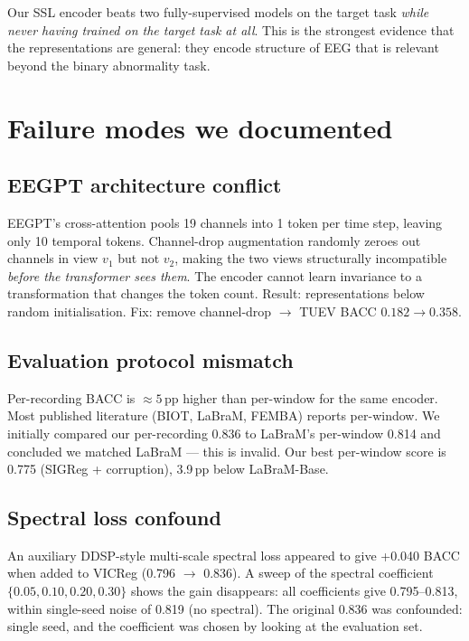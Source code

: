 \documentclass[11pt,a4paper]{article}
\begin{document}
Our SSL encoder beats two fully-supervised models on the target task \emph{while
never having trained on the target task at all}.  This is the strongest
evidence that the representations are general: they encode structure of EEG
that is relevant beyond the binary abnormality task.

\bigskip

\section{Failure modes we documented}

\subsection*{EEGPT architecture conflict}
EEGPT's cross-attention pools 19 channels into 1 token per time step, leaving
only 10 temporal tokens.  Channel-drop augmentation randomly zeroes out channels
in view $v_1$ but not $v_2$, making the two views structurally incompatible
\emph{before the transformer sees them}.  The encoder cannot learn invariance
to a transformation that changes the token count.  Result: representations
below random initialisation.  Fix: remove channel-drop $\to$ TUEV BACC
$0.182 \to 0.358$.

\subsection*{Evaluation protocol mismatch}
Per-recording BACC is $\approx5$\,pp higher than per-window for the same encoder.
Most published literature (BIOT, LaBraM, FEMBA) reports per-window.
We initially compared our per-recording 0.836 to LaBraM's per-window 0.814 and
concluded we matched LaBraM — this is invalid.
Our best per-window score is 0.775 (SIGReg + corruption), 3.9\,pp below LaBraM-Base.

\subsection*{Spectral loss confound}
An auxiliary DDSP-style multi-scale spectral loss appeared to give +0.040 BACC
when added to VICReg (0.796 $\to$ 0.836).  A sweep of the spectral coefficient
$\{0.05, 0.10, 0.20, 0.30\}$ shows the gain disappears:
all coefficients give 0.795--0.813, within single-seed noise of 0.819 (no spectral).
The original 0.836 was confounded: single seed, and the coefficient was chosen
by looking at the evaluation set.

\bigskip
\end{document}
